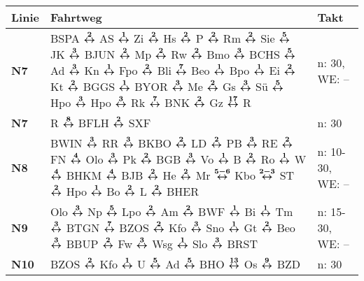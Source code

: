 \begin{minipage}[t]{0.05\textwidth}
\phantom{Tor}
\end{minipage}
\begin{minipage}[t]{0.45\textwidth}
\begin{tabular}{>{\bfseries}L{1.2cm}L{9.0cm}L{3.0cm}}
{\bfseries Linie} & {\bfseries Fahrtweg} & {\bfseries Takt} \\
\hline
\nbus{} N7    & BSPA $\xarwe{2}$ AS $\xarwe{1}$ Zi $\xarwe{2}$ Hs $\xarwe{2}$ P $\xarwe{2}$ Rm $\xarwe{2}$ Sie $\xarwe{5}$ JK $\xarwe{3}$ BJUN $\xarwe{2}$ Mp $\xarwe{2}$ Rw        %
                $\xarwe{2}$ Bmo $\xarwe{3}$ BCHS $\xarwe{5}$ Ad $\xarwe{3}$ Kn $\xarwe{1}$ Fpo $\xarwe{2}$ Bli $\xarwe{7}$ Beo $\xarwe{1}$ Bpo $\xarwe{1}$ Ei $\xarwe{2}$ Kt        %
                $\xarwe{2}$ BGGS $\xarwe{1}$ BYOR $\xarwe{3}$ Me $\xarwe{2}$ Gs $\xarwe{3}$ Sü $\xarwe{5}$ Hpo $\xarwe{3}$ Hpo $\xarwe{3}$ Rk $\xarwe{7}$ BNK $\xarwe{2}$ Gz        %
                $\xarwe{17}$ R                                                                                                                                                      & n: 30, WE: --              \\
\nbus{} N7    & R $\xarwe{8}$ BFLH $\xarwe{2}$ SXF                                                                                                                                  & n: 30                      \\
\nbus{} N8    & BWIN $\xarwe{3}$ RR $\xarwe{3}$ BKBO $\xarwe{2}$ LD $\xarwe{2}$ PB $\xarwe{3}$ RE $\xarwe{2}$ FN $\xarwe{4}$ Olo $\xarwe{3}$ Pk $\xarwe{2}$ BGB $\xarwe{3}$ Vo      %
                $\xarwe{1}$ B $\xarwe{2}$ Ro $\xarwe{1}$ W $\xarwe{4}$ BHKM $\xarwe{4}$ BJB $\xarwe{2}$ He $\xarwe{2}$ Mr $\xarwe{5-6}$ Kbo $\xarwe{2-3}$ ST $\xarwe{2}$ Hpo        %
                $\xarwe{1}$ Bo $\xarwe{2}$ L $\xarwe{2}$ BHER                                                                                                                       & n: 10-30, WE: --           \\
\nbus{} N9    & Olo $\xarwe{3}$ Np $\xarwe{5}$ Lpo $\xarwe{2}$ Am $\xarwe{2}$ BWF $\xarwe{1}$ Bi $\xarwe{1}$ Tm $\xarwe{3}$ BTGN $\xarwe{7}$ BZOS $\xarwe{2}$ Kfo $\xarwe{3}$ Sno   %
                $\xarwe{1}$ Gt $\xarwe{2}$ Beo $\xarwe{3}$ BBUP $\xarwe{2}$ Fw $\xarwe{3}$ Wsg $\xarwe{1}$ Slo $\xarwe{3}$ BRST                                                     & n: 15-30, WE: --           \\ 
\nbus{} N10   & BZOS $\xarwe{2}$ Kfo $\xarwe{1}$ U $\xarwe{5}$ Ad $\xarwe{5}$ BHO $\xarwe{13}$ Os $\xarwe{9}$ BZD                                                                   & n: 30                      \\

\end{tabular}
\end{minipage}
